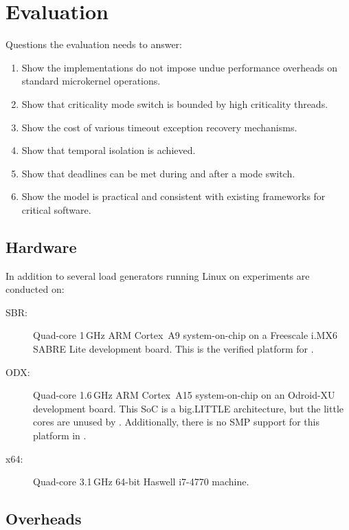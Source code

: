 \chapter{Evaluation}
\label{chap:evaluation}

Questions the evaluation needs to answer:

\begin{enumerate}
\item Show the implementations do not impose undue performance overheads on standard microkernel
operations.
\item Show that criticality mode switch is bounded by high criticality threads.
\item Show the cost of various timeout exception recovery mechanisms.
\item Show that temporal isolation is achieved.
\item Show that deadlines can be met during and after a mode switch.
\item Show the model is practical and consistent with existing frameworks for critical software.
\end{enumerate}

\section{Hardware}

In addition to several load generators running Linux on experiments are conducted on:

\begin{description}
    \item[SBR:] Quad-core 1\,GHz ARM Cortex~A9 system-on-chip on a Freescale i.MX6 SABRE Lite
        development board. This is the verified platform for \selfour.
    \item[ODX:] Quad-core 1.6\,GHz ARM Cortex~A15 system-on-chip on an Odroid-XU development board.
        This \gls{SoC} is a big.LITTLE architecture, but the little cores are unused by \selfour.
        Additionally, there is no SMP support for this platform in \selfour.
    \item[x64:] Quad-core 3.1\,GHz 64-bit Haswell i7-4770 machine.
\end{description}


\section{Overheads}

